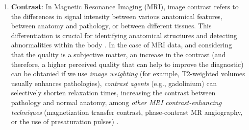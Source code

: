 \begin{enumerate}
{    to recognize the pathology}.
\item \textbf{Contrast}: In Magnetic Resonance Imaging (MRI),
    image contrast refers to the differences in signal intensity
    between various anatomical features, between anatomy and
    pathology, or between different tissues. This differentiation is
    crucial for identifying anatomical structures and detecting
    abnormalities within the body \cite{westbrook2018mri}. In the case of MRI data, and considering that the quality
  is a subjective matter, an increase in the contrast (and therefore,
  a higher perceived quality that can help to improve the diagnostic)
  can be obtanied if we use \emph{image weighting} (for example,
  T2-weighted volumes usually enhances pathologies), \emph{contrast agents}
  (e.g., gadolinium) can selectively shorten relaxation times,
  increasing the contrast between pathology and normal anatomy, among
  \emph{other MRI contrast-enhancing techniques} (magnetization
  transfer contrast, phase-contrast MR angiography, or the use of
  presaturation pulses) \cite{westbrook2018mri}.
\end{enumerate}
